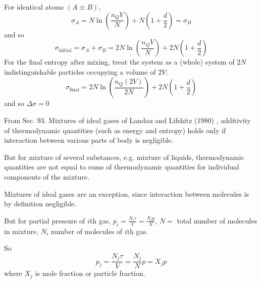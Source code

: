 For identical atoms $(A\equiv B)$, 
\[
\sigma_A = N \ln{ \left( \frac{ n_Q V}{N} \right) } + N \left( 1 + \frac{d}{2} \right) = \sigma_B
\]
and so
\[
\sigma_{\text{initial}} = \sigma_A + \sigma_B = 2N \ln{ \left( \frac{n_Q V}{N} \right) } + 2N\left( 1 + \frac{d}{2} \right) 
\]
For the final entropy after mixing, treat the system as a (whole) system of $2N$ indistinguishable particles occupying a volume of $2V$:
\[
\sigma_{\text{final}} = 2N \ln{ \left( \frac{n_Q(2V)}{2N} \right) } + 2N \left( 1 + \frac{d}{2} \right)
\]
and so $\Delta \sigma =0$


From Sec. 93. Mixtures of ideal gases of Landau and Lifshitz (1980) \cite{LLandauELifshitz1980}, additivity of thermodynamic quantities (such as energy and entropy) holds only if interaction between various parts of body is negligible. 

But for mixture of several substances, e.g. mixture of liquids, thermodynamic quantities are not equal to sums of thermodynamic quantities for individual components of the mixture. 

Mixtures of ideal gases are an exception, since interaction between molecules is by definition negligible.  

But for partial pressure of $i$th gas, $p_i = \frac{N_i\tau}{V} = \frac{N_i p}{N}$, $N = $ total number of molecules in mixture, $N_i$ number of molecules of $i$th gas.  

So
\[
p_j = \frac{ N_j \tau }{V} = \frac{ N_j}{N} p = X_j p 
\]
where $X_j$ is mole fraction or particle fraction.  




